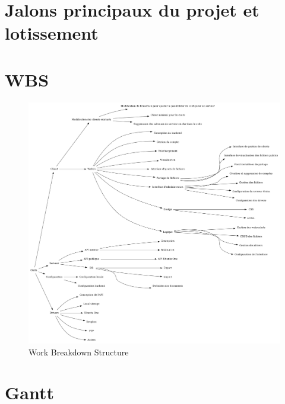 \section{Jalons principaux du projet et lotissement}


\newpage

\section{WBS}
\begin{figure}[ht]
    \includegraphics[width=\textwidth,height=\textheight,keepaspectratio]{wbs.png}
    \caption{Work Breakdown Structure}
\end{figure}

\section{Gantt}

